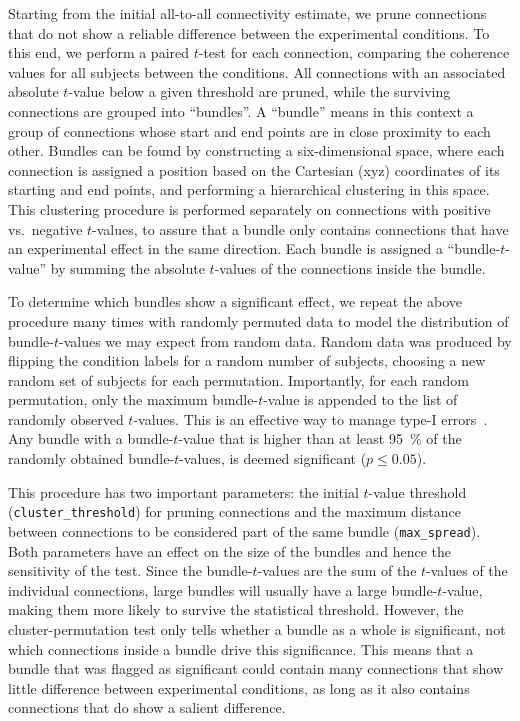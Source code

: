 \documentclass[utf8]{frontiersSCNS}
\renewcommand{\cite}[1]{~\citep{#1}}
\newcommand{\code}[1]{\lstinline{#1}}
\begin{document}
Starting from the initial all-to-all connectivity estimate, we prune connections that do not show a reliable difference between the experimental conditions.
To this end, we perform a paired $t$-test for each connection, comparing the coherence values for all subjects between the conditions.
All connections with an associated absolute $t$-value below a given threshold are pruned, while the surviving connections are grouped into ``bundles''.
A ``bundle'' means in this context a group of connections whose start and end points are in close proximity to each other.
Bundles can be found by constructing a six-dimensional space, where each connection is assigned a position based on the Cartesian (xyz) coordinates of its starting and end points, and performing a hierarchical clustering in this space.
This clustering procedure is performed separately on connections with positive vs.\ negative $t$-values, to assure that a bundle only contains connections that have an experimental effect in the same direction.
Each bundle is assigned a ``bundle-$t$-value'' by summing the absolute $t$-values of the connections inside the bundle.

To determine which bundles show a significant effect, we repeat the above procedure many times with randomly permuted data to model the distribution of bundle-$t$-values we may expect from random data.
Random data was produced by flipping the condition labels for a random number of subjects, choosing a new random set of subjects for each permutation.
Importantly, for each random permutation, only the maximum bundle-$t$-value is appended to the list of randomly observed $t$-values.
This is an effective way to manage type-I errors\cite{Maris2007}.
Any bundle with a bundle-$t$-value that is higher than at least \SI{95}{\percent} of the randomly obtained bundle-$t$-values, is deemed significant ($p \leq 0.05$).

This procedure has two important parameters: the initial $t$-value threshold (\code{cluster_threshold}) for pruning connections and the maximum distance between connections to be considered part of the same bundle (\code{max_spread}).
Both parameters have an effect on the size of the bundles and hence the sensitivity of the test.
Since the bundle-$t$-values are the sum of the $t$-values of the individual connections, large bundles will usually have a large bundle-$t$-value, making them more likely to survive the statistical threshold.
However, the cluster-permutation test only tells whether a bundle as a whole is significant, not which connections inside a bundle drive this significance.
This means that a bundle that was flagged as significant could contain many connections that show little difference between experimental conditions, as long as it also contains connections that do show a salient difference.
\end{document}
